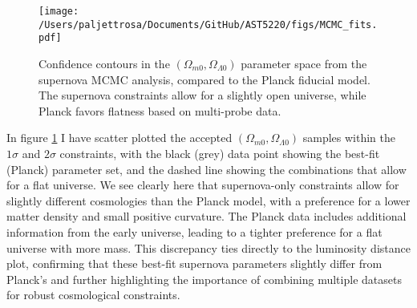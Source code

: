 \documentclass{aa}
\begin{document}
\begin{figure}
    \centering
    \texttt{[image: /Users/paljettrosa/Documents/GitHub/AST5220/figs/MCMC\_fits.pdf]}
    \caption{Confidence contours in the $(\Omega_{m0},\Omega_{\Lambda0})$ parameter space from the supernova MCMC analysis, compared to the Planck fiducial model. The supernova constraints allow for a slightly open universe, while Planck favors flatness based on multi-probe data.}\label{fig:MCMC fits}
\end{figure}

In figure \ref{fig:MCMC fits} I have scatter plotted the accepted $(\Omega_{m0},\Omega_{\Lambda0})$ samples within the $1\sigma$ and $2\sigma$ constraints, with the black (grey) data point showing the best-fit (Planck) parameter set, and the dashed line showing the combinations that allow for a flat universe. We see clearly here that supernova-only constraints allow for slightly different cosmologies than the Planck model, with a preference for a lower matter density and small positive curvature. The Planck data includes additional information from the early universe, leading to a tighter preference for a flat universe with more mass. This discrepancy ties directly to the luminosity distance plot, confirming that these best-fit supernova parameters slightly differ from Planck's and further highlighting the importance of combining multiple datasets for robust cosmological constraints.


\end{document}
